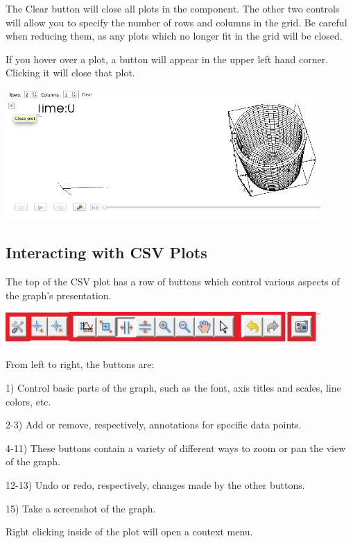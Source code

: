 \documentclass{article}
\begin{document}
The Clear button will close all plots in the component. The other two controls
will allow you to specify the number of rows and columns in the grid. Be careful
when reducing them, as any plots which no longer fit in the grid will be closed.

If you hover over a plot, a button will appear in the upper left hand corner.
Clicking it will close that plot. 

\begin{center}
\includegraphics[width=12cm]{images/ClosePlotButton}
\end{center}

\subsection{Interacting with CSV Plots}

The top of the CSV plot has a row of buttons which control various aspects of
the graph's presentation.  

\begin{center}
\includegraphics[width=12cm]{images/CSVControls}
\end{center}

From left to right, the buttons are:

1) Control basic parts of the graph, such as the font, axis titles and scales,
line colors, etc.

2-3) Add or remove, respectively, annotations for specific data points.

4-11) These buttons contain a variety of different ways to zoom or pan the view
of the graph. 

12-13) Undo or redo, respectively, changes made by the other buttons.

15) Take a screenshot of the graph.

Right clicking inside of the plot will open a context menu. 
\end{document}
